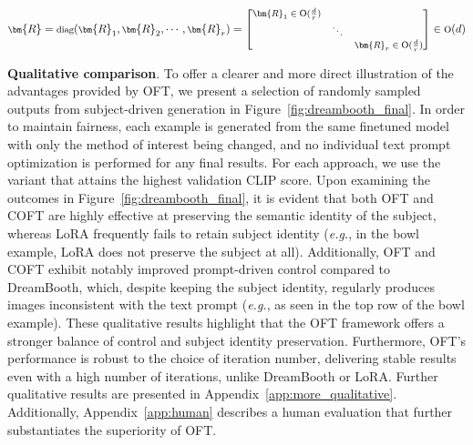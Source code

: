 \begin{equation}
    \footnotesize
    \bm{R}=\text{diag}(\bm{R}_1,\bm{R}_2,\cdots,\bm{R}_r)=\begin{bmatrix}
    \bm{R}_1\in \text{O}(\frac{d}{r}) &  &\\
    &\ddots & \\
    & & \bm{R}_r\in \text{O}(\frac{d}{r})
    \end{bmatrix}\in \text{O}(d)
\end{equation}

\begin{itemize}[leftmargin=*,nosep]

\textbf{Qualitative comparison}. To offer a clearer and more direct illustration of the advantages provided by OFT, we present a selection of randomly sampled outputs from subject-driven generation in Figure~\ref{fig:dreambooth_final}. In order to maintain fairness, each example is generated from the same finetuned model with only the method of interest being changed, and no individual text prompt optimization is performed for any final results. For each approach, we use the variant that attains the highest validation CLIP score. Upon examining the outcomes in Figure~\ref{fig:dreambooth_final}, it is evident that both OFT and COFT are highly effective at preserving the semantic identity of the subject, whereas LoRA frequently fails to retain subject identity (\emph{e.g.}, in the bowl example, LoRA does not preserve the subject at all). Additionally, OFT and COFT exhibit notably improved prompt-driven control compared to DreamBooth, which, despite keeping the subject identity, regularly produces images inconsistent with the text prompt (\emph{e.g.}, as seen in the top row of the bowl example). These qualitative results highlight that the OFT framework offers a stronger balance of control and subject identity preservation. Furthermore, OFT’s performance is robust to the choice of iteration number, delivering stable results even with a high number of iterations, unlike DreamBooth or LoRA. Further qualitative results are presented in Appendix~\ref{app:more_qualitative}. Additionally, Appendix~\ref{app:human} describes a human evaluation that further substantiates the superiority of OFT.

\begin{itemize}[leftmargin=*,nosep]


\end{itemize}
\end{itemize}
